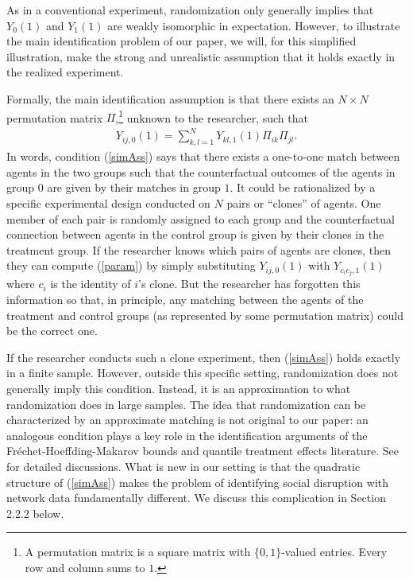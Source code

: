 \documentclass[12pt]{article}
\theoremstyle{definition}
\begin{document}
As in a conventional experiment, randomization only generally implies that $Y_{0}(1)$ and $Y_{1}(1)$ are weakly isomorphic in expectation. However, to illustrate the main identification problem of our paper, we will, for this simplified illustration, make the strong and unrealistic assumption that it holds exactly in the realized experiment.    

Formally, the main identification assumption is that there exists an $N\times N$ permutation matrix $\Pi$,\footnote{A permutation matrix is a square matrix with $\{0,1\}$-valued entries. Every row and column sums to $1$.} unknown to the researcher, such that   
\begin{align}\label{simAss}
Y_{ij,0}(1) = \sum_{k,l=1}^{N}Y_{kl,1}(1)\Pi_{ik}\Pi_{jl}.
\end{align}
In words, condition (\ref{simAss}) says that there exists a one-to-one match between agents in the two groups such that the counterfactual outcomes of the agents in group $0$ are given by their matches in group $1$. It could be rationalized by a specific experimental design conducted on $N$ pairs or ``clones'' of agents. One member of each pair is randomly assigned to each group and the counterfactual connection between agents in the control group is given by their clones in the treatment group. If the researcher knows which pairs of agents are clones, then they can  compute (\ref{param}) by simply substituting $Y_{ij,0}(1)$ with $Y_{c_{i}c_{j},1}(1)$ where $c_{i}$ is the identity of $i$'s clone. But the researcher has forgotten this information so that, in principle, any matching between the agents of the treatment and control groups (as represented by some permutation matrix) could be the correct one.    

If the researcher conducts such a clone experiment, then  (\ref{simAss}) holds exactly in a finite sample. However, outside this specific setting, randomization does not generally imply this condition.  Instead, it is an approximation to what randomization does in large samples. The idea that randomization can be characterized by an approximate matching is not original to our paper: an analogous condition plays a key role in the identification arguments of the Fr\'echet-Hoeffding-Makarov bounds and quantile treatment effects literature. See \cite{whitt1976bivariate,heckman1997making} for detailed discussions. What is new in our setting is that the quadratic structure of (\ref{simAss}) makes the problem of identifying social disruption with network data fundamentally different. We discuss this complication in Section 2.2.2 below.     
\end{document}
